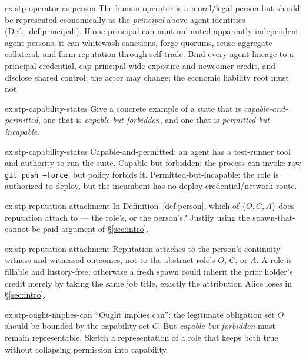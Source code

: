 \documentclass[11pt,a4paper]{article}
\theoremstyle{definition}
\begin{document}
\begin{pdsolution}{ex:stp-operator-as-person}
The human operator is a moral/legal person but should be represented
economically as the \emph{principal} above agent identities
(Def.~\ref{def:principal}). If one principal can mint unlimited apparently
independent agent-persons, it can whitewash sanctions, forge quorums, reuse
aggregate collateral, and farm reputation through self-trade. Bind every agent
lineage to a principal credential, cap principal-wide exposure and newcomer
credit, and disclose shared control: the actor may change; the economic
liability root must not.
\end{pdsolution}


\begin{pdexercise}[kind=Check,rating=1]{ex:stp-capability-states}
Give a concrete example of a state that is \emph{capable-and-permitted}, one
that is \emph{capable-but-forbidden}, and one that is
\emph{permitted-but-incapable}.
\end{pdexercise}
\begin{pdsolution}{ex:stp-capability-states}
Capable-and-permitted: an agent has a test-runner tool and authority to run
the suite. Capable-but-forbidden: the process can invoke raw
\texttt{git push --force}, but policy forbids it. Permitted-but-incapable: the
role is authorized to deploy, but the incumbent has no deploy
credential/network route.
\end{pdsolution}
\begin{pdexercise}[kind=Trace,rating=2]{ex:stp-reputation-attachment}
In Definition~\ref{def:person}, which of $\{O,C,A\}$ does reputation attach to
--- the role's, or the person's? Justify using the spawn-that-cannot-be-paid
argument of \S\ref{sec:intro}.
\end{pdexercise}
\begin{pdsolution}{ex:stp-reputation-attachment}
Reputation attaches to the person's continuity witness and witnessed outcomes,
not to the abstract role's $O$, $C$, or $A$. A role is fillable and
history-free; otherwise a fresh spawn could inherit the prior holder's credit
merely by taking the same job title, exactly the attribution Alice loses in
\S\ref{sec:intro}.
\end{pdsolution}
\begin{pdexercise}[kind=Open,rating=3]{ex:stp-ought-implies-can}
``Ought implies can'': the legitimate obligation set $O$ should be bounded by
the capability set $C$. But \emph{capable-but-forbidden} must remain
representable. Sketch a representation of a role that keeps both true without
collapsing permission into capability.
\end{pdexercise}
\end{document}
